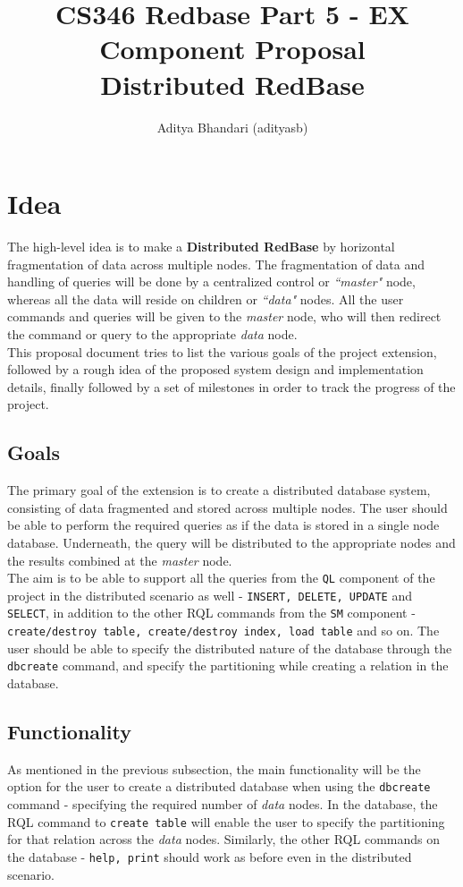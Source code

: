 \documentclass[letterpaper,11pt]{article}
\title{CS346 Redbase Part 5 - EX Component Proposal \\ Distributed RedBase}
\author{Aditya Bhandari (adityasb)}
\date{}
\begin{document}
\maketitle
\vspace{-1cm}


\section{Idea}
The high-level idea is to make a \textbf{Distributed RedBase} by horizontal fragmentation of data across
multiple nodes. The fragmentation of data and handling of queries will be done by a centralized
control or \textit{``master"} node, whereas all the data will reside on children or \textit{``data"}
nodes. All the user commands and queries will be given to the \textit{master} node, who will then
redirect the command or query to the appropriate \textit{data} node.\\

This proposal document tries to list the various goals of the project extension, followed by a rough
idea of the proposed system design and implementation details, finally followed by a set of milestones
in order to track the progress of the project.

\subsection{Goals}
The primary goal of the extension is to create a distributed database system, consisting of data
fragmented and stored across multiple nodes. The user should be able to perform the required queries
as if the data is stored in a single node database. Underneath, the query will be distributed to the
appropriate nodes and the results combined at the \textit{master} node.\\

The aim is to be able to support all the queries from the \texttt{QL} component of the project in the
distributed scenario as well - \texttt{INSERT, DELETE, UPDATE} and \texttt{SELECT}, in addition to
the other RQL commands from the \texttt{SM} component - \texttt{create/destroy table, create/destroy index,
load table} and so on. The user should be able to specify the distributed nature of the database
through the \texttt{dbcreate} command, and specify the partitioning while creating a relation in the
database.

\subsection{Functionality}
As mentioned in the previous subsection, the main functionality will be the option for the user to
create a distributed database when using the \texttt{dbcreate} command - specifying the required
number of \textit{data} nodes. In the database, the RQL command to \texttt{create table} will enable
the user to specify the partitioning for that relation across the \textit{data} nodes. Similarly,
the other RQL commands on the database - \texttt{help, print} should work as before even in the
distributed scenario.\\
\end{document}
